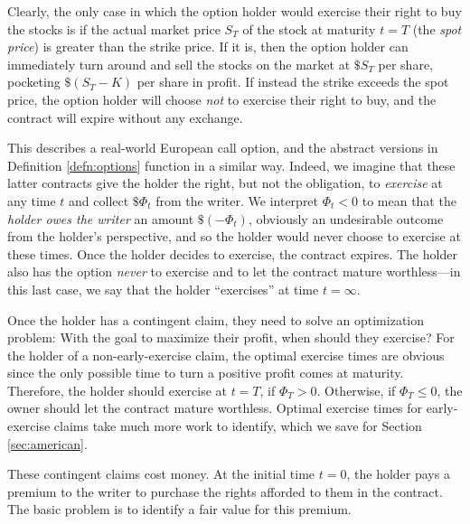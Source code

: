 \documentclass[reqno]{amsart}
\theoremstyle{definition}
\numberwithin{equation}{section}
\begin{document}
Clearly, the only case in which the option holder would exercise their right to buy the stocks is if the actual market price $S_T$ of the stock at maturity $t=T$ (the \textit{spot price}) is greater than the strike price. If it is, then the option holder can immediately turn around and sell the stocks on the market at $\$S_T$ per share, pocketing $\$(S_T-K)$ per share in profit. If instead the strike exceeds the spot price, the option holder will choose \textit{not} to exercise their right to buy, and the contract will expire without any exchange.

This describes a real-world European call option, and the abstract versions in Definition \ref{defn:options} function in a similar way. Indeed, we imagine that these latter contracts give the holder the right, but not the obligation, to \textit{exercise} at any time $t$ and collect $\$\Phi_t$ from the writer. We interpret $\Phi_t<0$ to mean that the \textit{holder owes the writer} an amount $\$(-\Phi_t)$, obviously an undesirable outcome from the holder's perspective, and so the holder would never choose to exercise at these times. Once the holder decides to exercise, the contract expires. The holder also has the option \textit{never} to exercise and to let the contract mature worthless---in this last case, we say that the holder ``exercises'' at time $t=\infty$.

Once the holder has a contingent claim, they need to solve an optimization problem: With the goal to maximize their profit, when  should they exercise? For the holder of a non-early-exercise claim, the optimal exercise times are obvious since the only possible time to turn a positive profit comes at maturity. Therefore, the holder should exercise at $t=T$, if $\Phi_T>0$. Otherwise, if $\Phi_T \leq 0$, the owner should let the contract mature worthless. Optimal exercise times for early-exercise claims take much more work to identify, which we save for Section \ref{sec:american}.

These contingent claims cost money. At the initial time $t=0$, the holder pays a premium to the writer to purchase the rights afforded to them in the contract. The basic problem is to identify a fair value for this premium.
\end{document}
